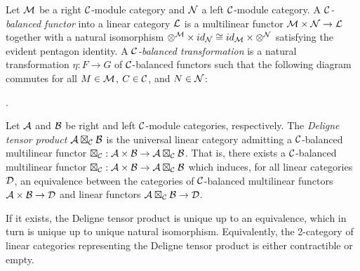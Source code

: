 \documentclass{amsart}
\begin{document}
\begin{definition}
	Let $\mathcal M$ be a right $\mathcal C$-module category and $\mathcal N$ a left $\mathcal C$-module category. A {\em $\mathcal C$-balanced functor} into a linear category $\mathcal L$ is a multilinear functor $\mathcal M \times \mathcal N \to \mathcal L$ together with a natural isomorphism $\otimes^{\mathcal M} \times id_{\mathcal N} \cong id_{\mathcal M} \times \otimes^{\mathcal N}$ satisfying the evident pentagon identity. A {\em $\mathcal C$-balanced transformation} is a natural transformation $\eta:F \to G$ of $\mathcal C$-balanced functors such that the following diagram commutes for all $M \in \mathcal M$, $C \in \mathcal C$, and $N \in \mathcal N$:
\begin{center}
.
\end{center}
\end{definition}


\begin{definition}
	Let $\mathcal A$ and $\mathcal B$ be right and left $\mathcal C$-module categories, respectively. The {\em Deligne tensor product $\mathcal A \boxtimes_{\mathcal C} \mathcal B$} is the universal linear category admitting a $\mathcal C$-balanced multilinear functor $\boxtimes_{\mathcal C}: \mathcal A \times \mathcal B \to \mathcal A \boxtimes_{\mathcal C} \mathcal B$. That is, there exists a $\mathcal C$-balanced multilinear functor $\boxtimes_{\mathcal C}: \mathcal A \times \mathcal B \to \mathcal A \boxtimes_{\mathcal C} \mathcal B$ which induces, for all linear categories $\mathcal D$, an equivalence between the categories of $\mathcal C$-balanced multilinear functors $\mathcal A \times \mathcal B \to \mathcal D$ and linear functors $\mathcal A \boxtimes_{\mathcal C} \mathcal B \to \mathcal D$. 
\end{definition}

If it exists, the Deligne tensor product is unique up to an equivalence, which in turn is unique up to unique natural isomorphism. Equivalently, the 2-category of linear categories representing the Deligne tensor product is either contractible or empty. 
\end{document}
